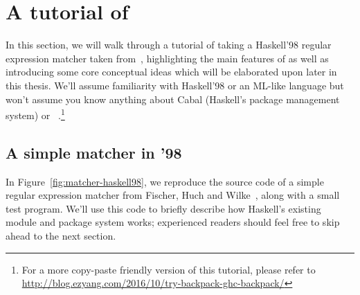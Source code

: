 \chapter{A tutorial of \Backpack{}}
\label{sec:tour}

In this section, we will walk through a tutorial of taking a Haskell'98
regular expression matcher taken
from~\cite{Fischer:2010:PRE:1863543.1863594}, highlighting the main
features of \Backpack{} as well as introducing some core conceptual
ideas which will be elaborated upon later in this thesis.  We'll assume
familiarity with Haskell'98 or an ML-like language but won't assume you
know anything about Cabal (Haskell's package management system) or
\OldBackpack{}~\cite{backpack}.\footnote{For a more copy-paste friendly
version of this tutorial, please refer to \url{http://blog.ezyang.com/2016/10/try-backpack-ghc-backpack/}}

\section{A simple matcher in '98}

In Figure~\ref{fig:matcher-haskell98}, we reproduce the source code of
a simple regular expression matcher
from Fischer, Huch and Wilke~\cite{Fischer:2010:PRE:1863543.1863594},
along with a small test program.  We'll use this code to briefly
describe how Haskell's existing module and package system works;
experienced readers should feel free to skip ahead to the next section.

